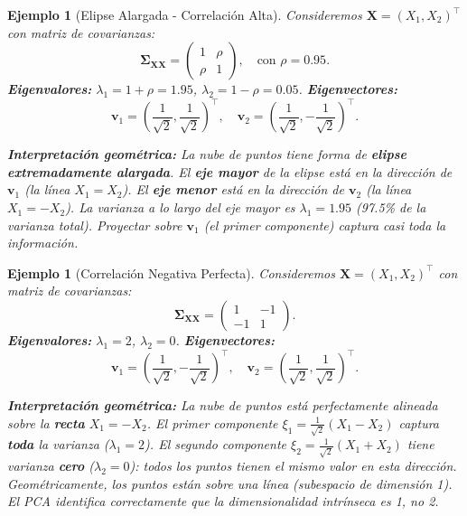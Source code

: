 \documentclass[11pt]{article}
\theoremstyle{plain}
\newtheorem{example}[theorem]{Ejemplo}
\newcommand{\X}{\mathbf{X}}
\newcommand{\bfSigma}{\boldsymbol{\Sigma}}
\begin{document}
\begin{example}[Elipse Alargada - Correlación Alta]
\label{ej:elipse}
Consideremos \(\X = (X_1, X_2)^\top\) con matriz de covarianzas:
\[
\bfSigma_{\X\X} = \begin{pmatrix} 1 & \rho \\ \rho & 1 \end{pmatrix}, \quad \text{con } \rho = 0.95.
\]
\textbf{Eigenvalores:} \(\lambda_1 = 1 + \rho = 1.95\), \(\lambda_2 = 1 - \rho = 0.05\). \textbf{Eigenvectores:}
\[
\mathbf{v}_1 = \left(\frac{1}{\sqrt{2}}, \frac{1}{\sqrt{2}}\right)^\top, \quad
\mathbf{v}_2 = \left(\frac{1}{\sqrt{2}}, -\frac{1}{\sqrt{2}}\right)^\top.
\]

\textbf{Interpretación geométrica:} La nube de puntos tiene forma de \textbf{elipse extremadamente alargada}. El \textbf{eje mayor} de la elipse está en la dirección de \(\mathbf{v}_1\) (la línea \(X_1 = X_2\)). El \textbf{eje menor} está en la dirección de \(\mathbf{v}_2\) (la línea \(X_1 = -X_2\)). La varianza a lo largo del eje mayor es \(\lambda_1 = 1.95\) (97.5\% de la varianza total). Proyectar sobre \(\mathbf{v}_1\) (el primer componente) captura casi toda la información.
\end{example}

\begin{example}[Correlación Negativa Perfecta]
\label{ej:negativa}
Consideremos \(\X = (X_1, X_2)^\top\) con matriz de covarianzas:
\[
\bfSigma_{\X\X} = \begin{pmatrix} 1 & -1 \\ -1 & 1 \end{pmatrix}.
\]
\textbf{Eigenvalores:} \(\lambda_1 = 2\), \(\lambda_2 = 0\). \textbf{Eigenvectores:}
\[
\mathbf{v}_1 = \left(\frac{1}{\sqrt{2}}, -\frac{1}{\sqrt{2}}\right)^\top, \quad
\mathbf{v}_2 = \left(\frac{1}{\sqrt{2}}, \frac{1}{\sqrt{2}}\right)^\top.
\]

\textbf{Interpretación geométrica:} La nube de puntos está perfectamente alineada sobre la \textbf{recta} \(X_1 = -X_2\). El primer componente \(\xi_1 = \frac{1}{\sqrt{2}}(X_1 - X_2)\) captura \textbf{toda} la varianza (\(\lambda_1 = 2\)). El segundo componente \(\xi_2 = \frac{1}{\sqrt{2}}(X_1 + X_2)\) tiene varianza \textbf{cero} (\(\lambda_2 = 0\)): todos los puntos tienen el mismo valor en esta dirección. Geométricamente, los puntos están sobre una línea (subespacio de dimensión 1). El PCA identifica correctamente que la dimensionalidad intrínseca es 1, no 2.
\end{example}
\end{document}
